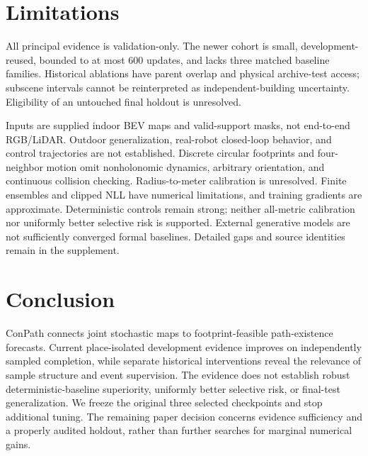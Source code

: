 \documentclass[conference,letterpaper,10pt]{IEEEtran}
\begin{document}
\section{Limitations}
All principal evidence is validation-only. The newer cohort is small, development-reused, bounded to at most 600 updates, and lacks three matched baseline families. Historical ablations have parent overlap and physical archive-test access; subscene intervals cannot be reinterpreted as independent-building uncertainty. Eligibility of an untouched final holdout is unresolved.

Inputs are supplied indoor BEV maps and valid-support masks, not end-to-end RGB/LiDAR. Outdoor generalization, real-robot closed-loop behavior, and control trajectories are not established. Discrete circular footprints and four-neighbor motion omit nonholonomic dynamics, arbitrary orientation, and continuous collision checking. Radius-to-meter calibration is unresolved. Finite ensembles and clipped NLL have numerical limitations, and training gradients are approximate. Deterministic controls remain strong; neither all-metric calibration nor uniformly better selective risk is supported. External generative models are not sufficiently converged formal baselines. Detailed gaps and source identities remain in the supplement.

\section{Conclusion}
ConPath connects joint stochastic maps to footprint-feasible path-existence forecasts. Current place-isolated development evidence improves on independently sampled completion, while separate historical interventions reveal the relevance of sample structure and event supervision. The evidence does not establish robust deterministic-baseline superiority, uniformly better selective risk, or final-test generalization. We freeze the original three selected checkpoints and stop additional tuning. The remaining paper decision concerns evidence sufficiency and a properly audited holdout, rather than further searches for marginal numerical gains.



\end{document}
